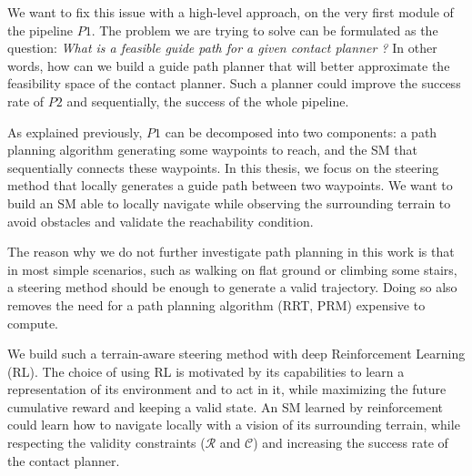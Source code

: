 We want to fix this issue with a high-level approach, on the very first module of the pipeline $P1$.
The problem we are trying to solve can be formulated as the question: \textit{What is a feasible guide path for a given contact planner ?} 
In other words, how can we build a guide path planner that will better approximate the feasibility space of the contact planner. Such a planner could improve the success rate of $P2$ and sequentially, the success of the whole pipeline.

As explained previously, $P1$ can be decomposed into two components: a path planning algorithm generating some waypoints to reach, and the SM that sequentially connects these waypoints.
In this thesis, we focus on the steering method that locally generates a guide path between two waypoints.
We want to build an SM able to locally navigate while observing the surrounding terrain to avoid obstacles and validate the reachability condition. 

The reason why we do not further investigate path planning in this work is that in most simple scenarios, such as walking on flat ground or climbing some stairs, a steering method should be enough to generate a valid trajectory. Doing so also removes the need for a path planning algorithm (RRT, PRM) expensive to compute.

We build such a terrain-aware steering method with deep Reinforcement Learning (RL).
The choice of using RL is motivated by its capabilities to learn a representation of its environment and to act in it, while maximizing the future cumulative reward and keeping a valid state.
An SM learned by reinforcement could learn how to navigate locally with a vision of its surrounding terrain, while respecting the validity constraints ($\mathcal{R}$ and $\mathcal{C}$) and increasing the success rate of the contact planner.

